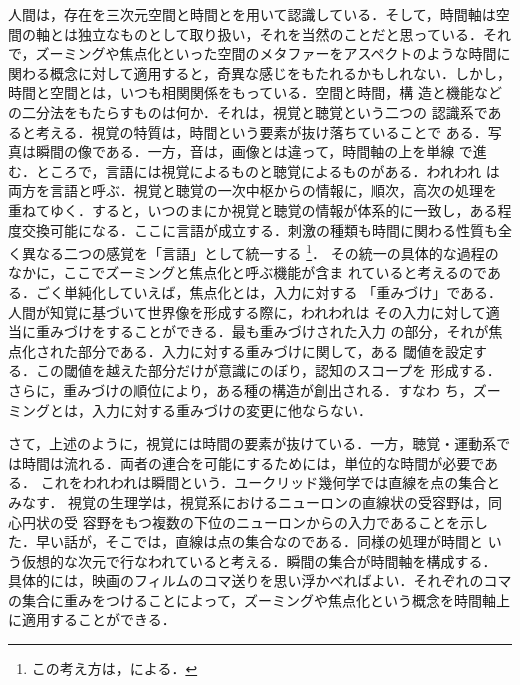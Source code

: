 人間は，存在を三次元空間と時間とを用いて認識している．そして，時間軸は空
間の軸とは独立なものとして取り扱い，それを当然のことだと思っている．それ
で，ズーミングや焦点化といった空間のメタファーをアスペクトのような時間に
関わる概念に対して適用すると，奇異な感じをもたれるかもしれない．しかし，
時間と空間とは，いつも相関関係をもっている\cite{本川92}．空間と時間，構
造と機能などの二分法をもたらすものは何か．それは，視覚と聴覚という二つの
認識系であると考える．視覚の特質は，時間という要素が抜け落ちていることで
ある．写真は瞬間の像である．一方，音は，画像とは違って，時間軸の上を単線
で進む．ところで，言語には視覚によるものと聴覚によるものがある．われわれ
は両方を言語と呼ぶ．視覚と聴覚の一次中枢からの情報に，順次，高次の処理を
重ねてゆく．すると，いつのまにか視覚と聴覚の情報が体系的に一致し，ある程
度交換可能になる．ここに言語が成立する．刺激の種類も時間に関わる性質も全
く異なる二つの感覚を「言語」として統一する
\footnote{
  この考え方は，\cite{養老89,養老96}による．
}．
その統一の具体的な過程のなかに，ここでズーミングと焦点化と呼ぶ機能が含ま
れていると考えるのである．ごく単純化していえば，焦点化とは，入力に対する
「重みづけ」である．人間が知覚に基づいて世界像を形成する際に，われわれは
その入力に対して適当に重みづけをすることができる．最も重みづけされた入力
の部分，それが焦点化された部分である．入力に対する重みづけに関して，ある
閾値を設定する．この閾値を越えた部分だけが意識にのぼり，認知のスコープを
形成する．さらに，重みづけの順位により，ある種の構造が創出される．すなわ
ち，ズーミングとは，入力に対する重みづけの変更に他ならない．

さて，上述のように，視覚には時間の要素が抜けている．一方，聴覚・運動系で
は時間は流れる．両者の連合を可能にするためには，単位的な時間が必要である．
これをわれわれは瞬間という．ユークリッド幾何学では直線を点の集合とみなす．
視覚の生理学は，視覚系におけるニューロンの直線状の受容野は，同心円状の受
容野をもつ複数の下位のニューロンからの入力であることを示した\cite{養老
  89}．早い話が，そこでは，直線は点の集合なのである．同様の処理が時間と
いう仮想的な次元で行なわれていると考える．瞬間の集合が時間軸を構成する．
具体的には，映画のフィルムのコマ送りを思い浮かべればよい．それぞれのコマ
の集合に重みをつけることによって，ズーミングや焦点化という概念を時間軸上
に適用することができる．

